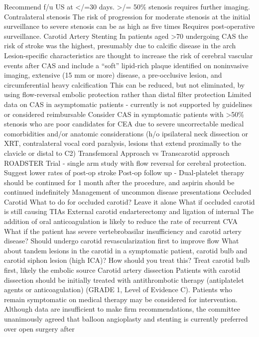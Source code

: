\documentclass[
]{book}
\theoremstyle{definition}
\theoremstyle{definition}
\theoremstyle{definition}
\theoremstyle{definition}
\theoremstyle{remark}
\begin{document}
Recommend f/u US at \textless/=30 days. \textgreater/= 50\% stenosis requires further
imaging. Contralateral stenosis The risk of progression for moderate
stenosis at the initial surveillance to severe stenosis can be as high
as five times Requires post-operative surveillance. Carotid Artery
Stenting In patients aged \textgreater70 undergoing CAS the risk of stroke was the
highest, presumably due to calcific disease in the arch Lesion-specific
characteristics are thought to increase the risk of cerebral vascular
events after CAS and include a ``soft'' lipid-rich plaque identified on
noninvasive imaging, extensive (15 mm or more) disease, a pre-occlusive
lesion, and circumferential heavy calcification This can be reduced, but
not eliminated, by using flow-reversal embolic protection rather than
distal filter protection Limited data on CAS in asymptomatic patients -
currently is not supported by guidelines or considered reimbursable
Consider CAS in symptomatic patients with \textgreater50\% stenosis who are poor
candidates for CEA due to severe uncorrectable medical comorbidities
and/or anatomic considerations (h/o ipsilateral neck dissection or XRT,
contralateral vocal cord paralysis, lesions that extend proximally to
the clavicle or distal to C2) Transfemoral Approach vs Transcarotid
approach ROADSTER Trial - single arm study with flow reversal for
cerebral protection. Suggest lower rates of post-op stroke Post-op
follow up - Dual-platelet therapy should be continued for 1 month after
the procedure, and aspirin should be continued indefinitely Management
of uncommon disease presentations Occluded Carotid What to do for
occluded carotid? Leave it alone What if occluded carotid is still
causing TIAs External carotid endarterectomy and ligation of internal
The addition of oral anticoagulation is likely to reduce the rate of
recurrent CVA What if the patient has severe vertebrobasilar
insufficiency and carotid artery disease? Should undergo carotid
revascularization first to improve flow What about tandem lesions in the
carotid in a symptomatic patient, carotid bulb and carotid siphon lesion
(high ICA)? How should you treat this? Treat carotid bulb first, likely
the embolic source Carotid artery dissection Patients with carotid
dissection should be initially treated with antithrombotic therapy
(antiplatelet agents or anticoagulation) (GRADE 1, Level of Evidence C).
Patients who remain symptomatic on medical therapy may be considered for
intervention. Although data are insufficient to make firm
recommendations, the committee unanimously agreed that balloon
angioplasty and stenting is currently preferred over open surgery after
\end{document}

